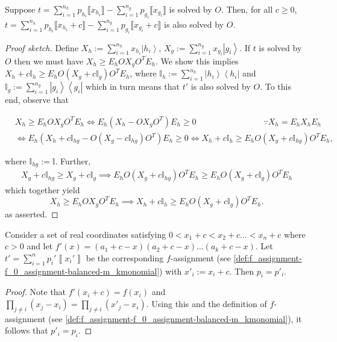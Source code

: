 \documentclass{theoretics}
\newcommand{\atul}[1]{#1} %
\begin{document}
\begin{lemma}\label{lem:validAfterTranslating}
  \atul{Suppose $t=\sum_{i=1}^{n_{h}}p_{h_{i}} \llbracket x_{h_{i}} \rrbracket - \sum_{i=1}^{n_g}p_{g_{i}} \llbracket x_{g_{i}} \rrbracket$ is solved by $O$. Then, for all $c \ge 0$, $t=\sum_{i=1}^{n_{h}}p_{h_{i}} \llbracket x_{h_{i}} + c \rrbracket - \sum_{i=1}^{n_g}p_{g_{i}} \llbracket x_{g_{i}} + c \rrbracket$ is also solved by $O$.}
\end{lemma}
\atul{
  \begin{proof}[Proof sketch]
    Define $X_{h}:=\sum_{i=1}^{n_{h}}x_{h_{i}}\left|h_{i}\right\rangle $,
    $X_{g}:=\sum_{i=1}^{n_{g}}x_{g_{i}}\left|g_{i}\right\rangle $. If
    $t$ is solved by $O$ then we must have $X_{h}\ge E_{h}OX_{g}O^{T}E_{h}$.
    We show this implies $X_{h}+c\mathbb{I}_{h}\ge E_{h}O(X_{g}+c\mathbb{I}_{g})O^{T}E_{h}$,
    where $\mathbb{I}_{h}:=\sum_{i=1}^{n_{h}}\left|h_{i}\right\rangle \left\langle h_{i}\right|$
    and $\mathbb{I}_{g}:=\sum_{i=1}^{n_{g}}\left|g_{i}\right\rangle \left\langle g_{i}\right|$ which in turn means that $t'$ is also solved by $O$. %
    To this end, observe that
    \begin{small}
      \begin{align*}
         & X_{h}  \ge E_{h}OX_{g}O^{T}E_{h} \iff E_{h}(X_{h}-OX_{g}O^{T})E_{h}  \ge0 \qquad\qquad\qquad\qquad \because X_{h}=E_{h}X_{h}E_{h} \\
         & \iff E_{h}(X_{h}+c\mathbb{I}_{hg}-O(X_{g}-c\mathbb{I}_{hg})O^{T})E_{h}  \ge0
        \iff X_{h}+c\mathbb{I}_{h}  \ge E_{h}O(X_{g}+c\mathbb{I}_{hg})O^{T}E_{h},
      \end{align*}
    \end{small}
    where $\mathbb{I}_{hg}:=\mathbb{I}$. Further,
    \begin{align*}
      X_{g}+c\mathbb{I}_{hg}  \ge X_{g}+c\mathbb{I}_{g}
      \implies E_{h}O(X_{g}+c\mathbb{I}_{hg})O^{T}E_{h}  \ge E_{h}O(X_{g}+c\mathbb{I}_{g})O^{T}E_{h}
    \end{align*}
    which together yield
    \begin{displaymath}
      X_{h}\ge E_{h}OX_{g}O^{T}E_{h} \implies X_{h}+c\mathbb{I}_{h}\ge E_{h}O(X_{g}+c\mathbb{I}_{g})O^{T}E_{h}.
    \end{displaymath}
    as asserted.
  \end{proof}
}

\begin{lemma}\label{lem:fAssignmentTranslation}
  \atul{Consider a set of real
  coordinates satisfying $0<x_{1}+c<x_{2}+c\dots<x_{n}+c$ where $c>0$
  and let $f'(x)=(a_{1}+c-x)(a_{2}+c-x)\dots(a_{k}+c-x)$. Let $t'=\sum_{i=1}^{n}p_{i}'\left\llbracket x_{i}'\right\rrbracket $
  be the corresponding $f$-assignment (see \cref{def:f_assignment-f_0_assignment-balanced-m_kmonomial}) with $x'_{i}:=x_{i}+c$.
  Then $p_{i}=p'_{i}$.} %
\end{lemma}
\atul{
  \begin{proof}
    Note that $f'(x_i+c)=f(x_i)$ and $\prod_{j\neq i} (x_j -x_i) = \prod_{j\neq i} (x'_j -x_i)$. Using this and the definition of $f$-assignment (see \cref{def:f_assignment-f_0_assignment-balanced-m_kmonomial}), it follows that $p'_i=p_i$.
  \end{proof}
}
\end{document}
